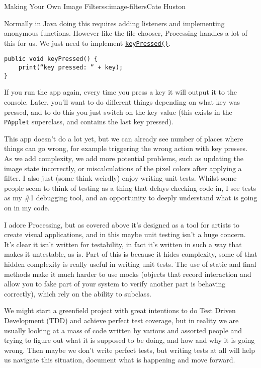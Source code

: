 \begin{aosachapter}{Making Your Own Image Filters}{s:image-filters}{Cate Huston}
\label{responding-to-key-presses}

Normally in Java doing this requires adding listeners and implementing
anonymous functions. However like the file chooser, Processing handles a
lot of this for us. We just need to implement
\href{https://www.processing.org/reference/keyPressed_.html}{\texttt{keyPressed()}}.

\begin{verbatim}
public void keyPressed() {
    print(“key pressed: ” + key);
}
\end{verbatim}

If you run the app again, every time you press a key it will output it
to the console. Later, you'll want to do different things depending on
what key was pressed, and to do this you just switch on the key value
(this exists in the \texttt{PApplet} superclass, and contains the last
key pressed).

\label{writing-tests}

This app doesn't do a lot yet, but we can already see number of places
where things can go wrong, for example triggering the wrong action with
key presses. As we add complexity, we add more potential problems, such
as updating the image state incorrectly, or miscalculations of the pixel
colors after applying a filter. I also just (some think weirdly) enjoy
writing unit tests. Whilst some people seem to think of testing as a
thing that delays checking code in, I see tests as my \#1 debugging
tool, and an opportunity to deeply understand what is going on in my
code.

I adore Processing, but as covered above it's designed as a tool for
artists to create visual applications, and in this maybe unit testing
isn't a huge concern. It's clear it isn't written for testability, in
fact it's written in such a way that makes it untestable, as is. Part of
this is because it hides complexity, some of that hidden complexity is
really useful in writing unit tests. The use of static and final methods
make it much harder to use mocks (objects that record interaction and
allow you to fake part of your system to verify another part is behaving
correctly), which rely on the ability to subclass.

We might start a greenfield project with great intentions to do Test
Driven Development (TDD) and achieve perfect test coverage, but in
reality we are usually looking at a mass of code written by various and
assorted people and trying to figure out what it is supposed to be
doing, and how and why it is going wrong. Then maybe we don't write
perfect tests, but writing tests at all will help us navigate this
situation, document what is happening and move forward.


\end{aosachapter}
